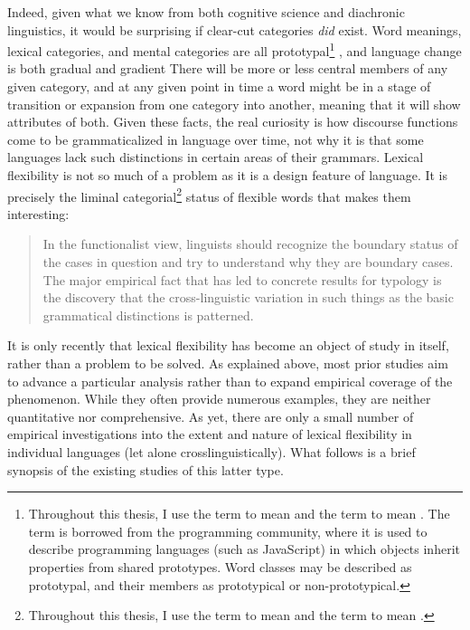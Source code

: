 Indeed, given what we know from both cognitive science and diachronic linguistics, it would be surprising if clear-cut categories \emph{did} exist. Word meanings, lexical categories, and mental categories are all prototypal\footnote{Throughout this thesis, I use the term  to mean  and the term  to mean . The term  is borrowed from the programming community, where it is used to describe programming languages (such as JavaScript) in which objects inherit properties from shared prototypes. Word classes may be described as prototypal, and their members as prototypical or non-prototypical.} \parencite{Taylor2003}, and language change is both gradual and gradient \parencites{HopperTraugott2003}{TraugottTrousdale2010} There will be more or less central members of any given category, and at any given point in time a word might be in a stage of transition or expansion from one category into another, meaning that it will show attributes of both. Given these facts, the real curiosity is how discourse functions come to be grammaticalized in language over time, not why it is that some languages lack such distinctions in certain areas of their grammars. Lexical flexibility is not so much of a problem as it is a design feature of language. It is precisely the liminal categorial\footnote{Throughout this thesis, I use the term  to mean  and the term  to mean .} status of flexible words that makes them interesting:

\blockquote[{\cite[23]{Croft1991}}]{In the functionalist view, linguists should recognize the boundary status of the cases in question and try to understand why they are boundary cases. The major empirical fact that has led to concrete results for typology is the discovery that the cross-linguistic variation in such things as the basic grammatical distinctions is patterned.}

It is only recently that lexical flexibility has become an object of study in itself, rather than a problem to be solved. As explained above, most prior studies aim to advance a particular analysis rather than to expand empirical coverage of the phenomenon. While they often provide numerous examples, they are neither quantitative nor comprehensive. As yet, there are only a small number of empirical investigations into the extent and nature of lexical flexibility in individual languages (let alone crosslinguistically). What follows is a brief synopsis of the existing studies of this latter type.


